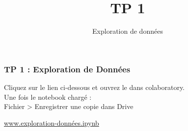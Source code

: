 \documentclass{formation}
\title{TP 1}
\subtitle{Exploration de données}
\begin{document}
\maketitle

\begin{frame}
  \frametitle{TP 1 : Exploration de Données}
  Cliquez sur le lien ci-dessous et ouvrez le dans colaboratory. \\
  Une fois le notebook chargé : \\
  Fichier > Enregistrer une copie dans Drive \\
  \begin{center}
    \href{https://colab.research.google.com/drive/1T-L2OM0LnY83AtkpJJfkHqvUf51GU56d}{www.exploration-données.ipynb}
  \end{center}
\end{frame}
\end{document}
